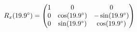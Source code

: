 \documentclass[preview]{standalone}
\begin{document}
\begin{align*}
\special{dvisvgm:raw <g id='unique000'>}R_x(19.9^\circ) = \begin{pmatrix} 1 & 0 & 0 \\ 0 & \cos(19.9^\circ) & -\sin(19.9^\circ) \\ 0 & \sin(19.9^\circ) & \cos(19.9^\circ) \end{pmatrix}\special{dvisvgm:raw </g>}
\end{align*}
\end{document}
